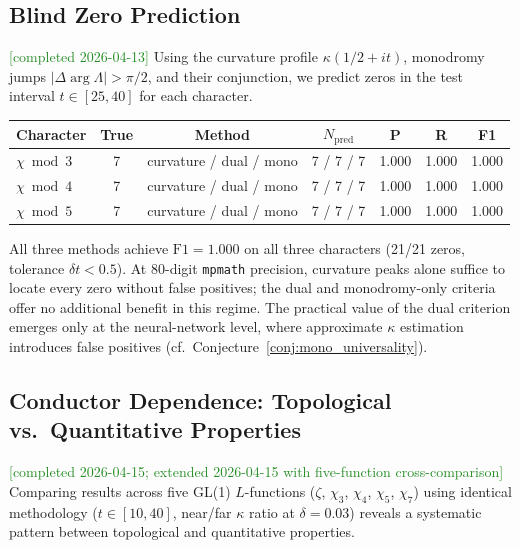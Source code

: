 \documentclass[11pt, a4paper]{article}
\theoremstyle{definition}
\theoremstyle{plain}
\begin{document}
\subsection{Blind Zero Prediction}
\label{app:dirichlet:blind}

\textcolor{ForestGreen}{[completed 2026-04-13]}
Using the curvature profile $\kappa(1/2+it)$, monodromy jumps
$|\Delta\arg\Lambda|>\pi/2$, and their conjunction, we predict
zeros in the test interval $t\in[25,40]$ for each character.

\begin{center}
\small
\begin{tabular}{lcccccc}
\toprule
\textbf{Character} & \textbf{True} & \textbf{Method} & $N_{\mathrm{pred}}$ & \textbf{P} & \textbf{R} & \textbf{F1} \\
\midrule
$\chi\bmod 3$ & 7 & curvature / dual / mono & 7 / 7 / 7 & 1.000 & 1.000 & 1.000 \\
$\chi\bmod 4$ & 7 & curvature / dual / mono & 7 / 7 / 7 & 1.000 & 1.000 & 1.000 \\
$\chi\bmod 5$ & 7 & curvature / dual / mono & 7 / 7 / 7 & 1.000 & 1.000 & 1.000 \\
\bottomrule
\end{tabular}
\end{center}

\noindent
All three methods achieve $\mathrm{F1}=1.000$ on all three characters
(21/21 zeros, tolerance $\delta t < 0.5$).
At 80-digit \texttt{mpmath} precision, curvature peaks alone suffice
to locate every zero without false positives; the dual and
monodromy-only criteria offer no additional benefit in this regime.
The practical value of the dual criterion emerges only at the
neural-network level, where approximate $\kappa$ estimation introduces
false positives (cf.\ Conjecture~\ref{conj:mono_universality}).


\subsection{Conductor Dependence: Topological vs.\ Quantitative Properties}
\label{app:dirichlet:conductor}

\textcolor{ForestGreen}{[completed 2026-04-15; extended 2026-04-15 with five-function cross-comparison]}
Comparing results across five GL(1) $L$-functions ($\zeta$, $\chi_3$, $\chi_4$,
$\chi_5$, $\chi_7$) using identical methodology ($t\in[10,40]$, near/far
$\kappa$ ratio at $\delta{=}0.03$) reveals a systematic pattern between
topological and quantitative properties.
\end{document}
